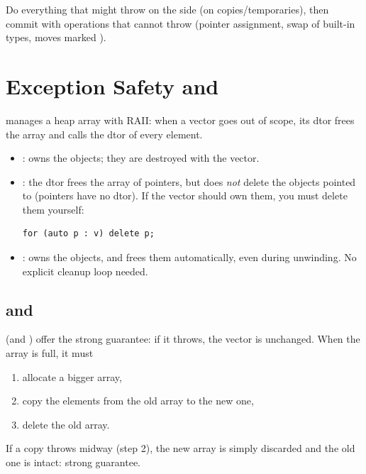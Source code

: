 \begin{important}
Do everything that might throw on the side (on copies/temporaries), then commit
with operations that cannot throw (pointer assignment, swap of built-in types,
moves marked ).
\end{important}

\section{Exception Safety and }
 manages a heap array with RAII: when a vector goes out of scope,
its dtor frees the array and calls the dtor of every element.

\begin{itemize}
  \item {}: owns the  objects; they are destroyed with
        the vector.
  \item {}: the dtor frees the array of pointers, but does
        \emph{not} delete the objects pointed to (pointers have no dtor). If the
        vector should own them, you must delete them yourself:
\begin{lstlisting}[style=cpp]
for (auto p : v) delete p;
\end{lstlisting}
  \item {}: owns the objects, and frees them
        automatically, even during unwinding. No explicit cleanup loop needed.
\end{itemize}

\subsection{ and }
 (and ) offer the strong guarantee:
if it throws, the vector is unchanged. When the array is full, it must
\begin{enumerate}
  \item allocate a bigger array,
  \item copy the elements from the old array to the new one,
  \item delete the old array.
\end{enumerate}
If a copy throws midway (step 2), the new array is simply discarded and the old
one is intact: strong guarantee.

